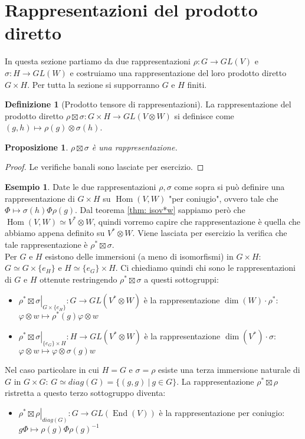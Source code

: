 \documentclass[11pt]{article}
\theoremstyle{plain}
\newtheorem{prop}[thm]{Proposizione}
\theoremstyle{definition}
\newtheorem{defn}{Definizione}[section]
\newtheorem{exmp}{Esempio}[section]
\theoremstyle{remark}
\DeclareMathOperator{\Hom}{Hom}
\DeclareMathOperator{\End}{End}
\DeclareMathOperator{\iso}{\simeq}
\begin{document}
\section{Rappresentazioni del prodotto diretto}
In questa sezione partiamo da due rappresentazioni $\rho:G\to GL(V)$ e $\sigma:H\to GL(W)$ e costruiamo una rappresentazione del loro prodotto diretto $G\times H$. Per tutta la sezione si supporranno $G$ e $H$ finiti.
\begin{defn}[Prodotto tensore di rappresentazioni]
	La rappresentazione del prodotto diretto $\rho\boxtimes\sigma:G\times H\to GL(V\otimes W)$ si definisce come $(g, h)\mapsto \rho(g)\otimes\sigma(h)$.
\end{defn}
\begin{prop}
	$\rho\boxtimes\sigma$ è una rappresentazione.
\end{prop}
\begin{proof}
	Le verifiche banali sono lasciate per esercizio.
\end{proof}
\begin{exmp}
	Date le due rappresentazioni $\rho, \sigma$ come sopra si può definire una rappresentazione di $G\times H$ su $\Hom(V, W)$ "per coniugio", ovvero tale che $\Phi \mapsto \sigma(h)\Phi\rho(g)$. Dal teorema \ref{thm: isov*w} sappiamo però che $\Hom(V, W)\iso V^*\otimes W$, quindi vorremo capire che rappresentazione è quella che abbiamo appena definito su $V^*\otimes W$. Viene lasciata per esercizio la verifica che tale rappresentazione è $\rho^*\boxtimes\sigma$.\\
	Per $G$ e $H$ esistono delle immersioni (a meno di isomorfismi) in $G\times H$: $G\iso G\times\lbrace e_H\rbrace$ e $H\iso\lbrace e_G\rbrace\times H$. Ci chiediamo quindi chi sono le rappresentazioni di $G$ e $H$ ottenute restringendo $\rho^*\boxtimes\sigma$ a questi sottogruppi:
	\begin{itemize}
		\item $\left.\rho^*\boxtimes\sigma\right|_{G\times\lbrace e_H\rbrace}:G\to GL(V^*\otimes W)$ è la rappresentazione $\dim(W)\cdot\rho^*$: $\varphi\otimes w \mapsto \rho^*(g)\varphi\otimes w$
		\item $\left.\rho^*\boxtimes\sigma\right|_{\lbrace e_G\rbrace\times H}:H\to GL(V^*\otimes W)$ è la rappresentazione $\dim(V^*)\cdot\sigma$: $\varphi\otimes w \mapsto \varphi\otimes \sigma(g)w$
	\end{itemize}
	Nel caso particolare in cui $H=G$ e $\sigma=\rho$ esiste una terza immersione naturale di $G$ in $G\times G$: $G\iso diag(G) = \lbrace(g, g)\ |\ g\in G\rbrace$. La rappresentazione $\rho^*\boxtimes\rho$ ristretta a questo terzo sottogruppo diventa:
	\begin{itemize}
		\item $\left.\rho^*\boxtimes\rho\right|_{diag(G)}:G\to GL(\End(V))$ è la rappresentazione per coniugio: $g\Phi\mapsto\rho(g)\Phi\rho(g)^{-1}$
	\end{itemize}
\end{exmp}
\end{document}

